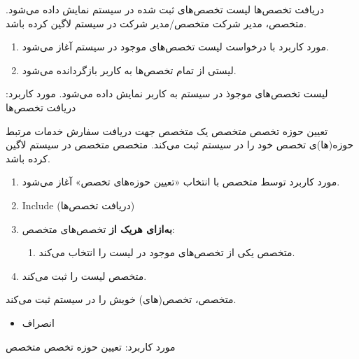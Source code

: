 
\usecase
{دریافت تخصص‌ها}
{}
{لیست تخصص‌های ثبت شده در سیستم نمایش داده می‌شود.}
{متخصص، مدیر شرکت}
{}
{متخصص/مدیر شرکت در سیستم لاگین کرده باشد.}
{
	\vspace*{-0.6cm}
	\begin{enumerate}
		\item مورد کاربرد با درخواست لیست تخصص‌های موجود در سیستم آغاز می‌شود.
		\item لیستی از تمام تخصص‌ها به کاربر بازگردانده می‌شود.
	\end{enumerate}
}
{لیست تخصص‌های موجوذ در سیستم به کاربر نمایش داده می‌شود.}
{
}
{
	مورد کاربرد: دریافت تخصص‌ها
}


\usecase
{تعیین حوزه تخصص متخصص}
{}
{یک متخصص جهت دریافت سفارش خدمات مرتبط حوزه‌(ها)ی تخصص خود را در سیستم ثبت می‌کند.}
{متخصص}
{}
{متخصص در سیستم لاگین کرده باشد.}
{
	\vspace*{-0.6cm}
	\begin{enumerate}
		\item مورد کاربرد توسط متخصص با انتخاب «تعیین حوزه‌های تخصص» آغاز می‌شود.
		\item Include (دریافت تخصص‌ها)
		\item 
		\textbf{به‌ازای هریک از}
		تخصص‌های متخصص:
		\begin{enumerate}[label=\theenumi.\arabic*.]
			\item متخصص یکی از تخصص‌های موجود در لیست را انتخاب می‌کند.
		\end{enumerate}
		\item 
		متخصص لیست را ثبت می‌کند.
	\end{enumerate}
}
{متخصص، تخصص(های) خویش را در سیستم ثبت می‌کند.}
{
	\begin{itemize}
		\vspace*{-0.6cm}
		\item انصراف
	\end{itemize}
}
{
	مورد کاربرد: تعیین حوزه تخصص متخصص
}


